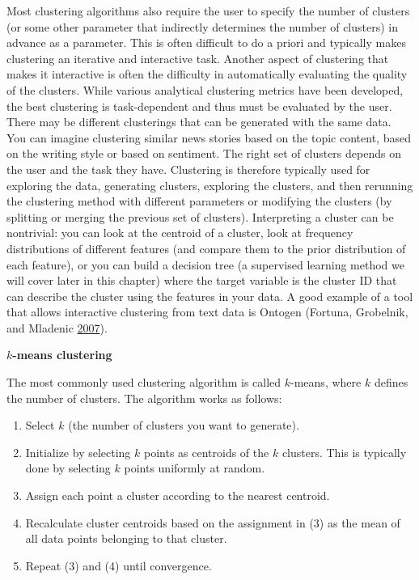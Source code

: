 \documentclass[]{krantz}
\begin{document}
Most clustering algorithms also require the user to specify the number
of clusters (or some other parameter that indirectly determines the
number of clusters) in advance as a parameter. This is often difficult
to do a priori and typically makes clustering an iterative and
interactive task. Another aspect of clustering that makes it interactive
is often the difficulty in automatically evaluating the quality of the
clusters. While various analytical clustering metrics have been
developed, the best clustering is task-dependent and thus must be
evaluated by the user. There may be different clusterings that can be
generated with the same data. You can imagine clustering similar news
stories based on the topic content, based on the writing style or based
on sentiment. The right set of clusters depends on the user and the task
they have. Clustering is therefore typically used for exploring the
data, generating clusters, exploring the clusters, and then rerunning
the clustering method with different parameters or modifying the
clusters (by splitting or merging the previous set of clusters).
Interpreting a cluster can be nontrivial: you can look at the centroid
of a cluster, look at frequency distributions of different features (and
compare them to the prior distribution of each feature), or you can
build a decision tree (a supervised learning method we will cover later
in this chapter) where the target variable is the cluster ID that can
describe the cluster using the features in your data. A good example of
a tool that allows interactive clustering from text data is Ontogen
(Fortuna, Grobelnik, and Mladenic
\protect\hyperlink{ref-Ontogen}{2007}).

\textbf{\(k\)-means clustering}

The most commonly used clustering algorithm is called \(k\)-means, where
\(k\) defines the number of clusters. The algorithm works as follows:

\begin{enumerate}
\def\labelenumi{\arabic{enumi}.}
\item
  Select \(k\) (the number of clusters you want to generate).
\item
  Initialize by selecting \(k\) points as centroids of the \(k\)
  clusters. This is typically done by selecting \(k\) points uniformly
  at random.
\item
  Assign each point a cluster according to the nearest centroid.
\item
  Recalculate cluster centroids based on the assignment in (3) as the
  mean of all data points belonging to that cluster.
\item
  Repeat (3) and (4) until convergence.
\end{enumerate}
\end{document}
